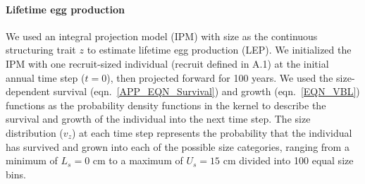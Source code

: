 \documentclass[12pt, oneside]{article}   	%
\begin{document}



\paragraph*{Lifetime egg production}

We used an integral projection model (IPM) \citep{ellner2016data} with size as the continuous structuring trait $z$ to estimate lifetime egg production (LEP). We initialized the IPM with one recruit-sized individual (recruit defined in A.1) at the initial annual time step ($t=0$), then projected forward for 100 years. We used the size-dependent survival (eqn.\ \ref{APP_EQN_Survival}) and growth (eqn.\ \ref{EQN_VBL}) functions as the probability density functions in the kernel to describe the survival and growth of the individual into the next time step. The size distribution ($v_z$) at each time step represents the probability that the individual has survived and grown into each of the possible size categories, ranging from a minimum of $L_s=0$ cm to a maximum of $U_s=15$ cm divided into 100 equal size bins. %
\end{document}
